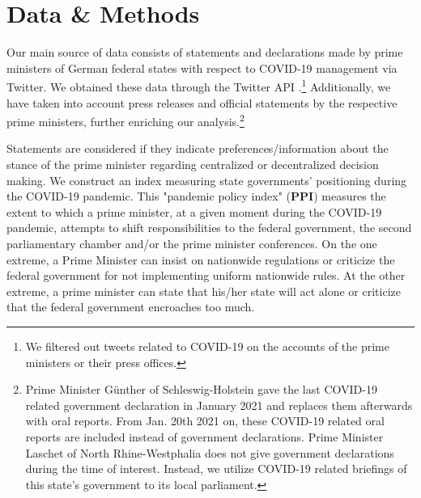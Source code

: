 \documentclass[12pt, abstract=true]{scrartcl}
\begin{document}
\section{Data \& Methods}\label{sec.datamethods}
Our main source of data consists of statements and declarations made by prime ministers of German federal states with respect to COVID-19 management via Twitter. We obtained these data through the Twitter API \citep{Kearney2019}.\footnote{
    We filtered out tweets related to COVID-19 on the accounts of the prime ministers or their press offices.
} Additionally, we have taken into account press releases and official statements by the respective prime ministers, further enriching our analysis.\footnote{
	Prime Minister Günther of Schleswig-Holstein gave the last COVID-19 related government declaration in January 2021 and replaces them afterwards with oral reports. From Jan. 20th 2021 on, these COVID-19 related oral reports are included instead of government declarations. Prime Minister Laschet of North Rhine-Westphalia does not give government declarations during the time of interest. Instead, we utilize COVID-19 related briefings of this state’s government to its local parliament.}

Statements are considered if they indicate preferences/information about the stance of the prime minister regarding centralized or decentralized decision making. We construct an index measuring state governments’ positioning during the COVID-19 pandemic. This "pandemic policy index" (\textbf{PPI}) measures the extent to which a prime minister, at a given moment during the COVID-19 pandemic, attempts to shift responsibilities to the federal government, the second parliamentary chamber and/or the prime minister conferences. On the one extreme, a Prime Minister can insist on nationwide regulations or criticize the federal government for not implementing uniform nationwide rules. At the other extreme, a prime minister can state that his/her state will act alone or criticize that the federal government encroaches too much.
\end{document}
